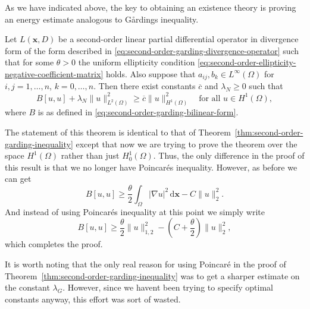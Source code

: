 As we have indicated above, the key to obtaining an existence theory is proving an energy estimate analogous to Gårding\textquotesingle s inequality.

\begin{Theorem}
\label{thm:neumann-energy-estimate}
Let $L(\bm{x},D)$ be a second-order linear partial differential operator in divergence form of the form described in \eqref{eq:second-order-garding-divergence-operator} such that for some $\theta>0$ the uniform ellipticity condition \eqref{eq:second-order-ellipticity-negative-coefficient-matrix} holds. Also suppose that $a_{ij},b_k\in L^\infty(\Omega)$ for $i,j=1,\ldots,n$, $k=0,\ldots,n$. Then there exist constants $\overline c$ and $\lambda_N\geq0$ such that
\begin{equation}\label{eq:neumann-energy-coercivity-inequality}
B[u,u]+\lambda_N\|u\|_{L^2(\Omega)}^2\geq\overline c\|u\|_{H^1(\Omega)}^2\quad\text{for all }u\in H^1(\Omega),
\end{equation}
where $B$ is as defined in \eqref{eq:second-order-garding-bilinear-form}.
\end{Theorem}

\begin{Proof}
The statement of this theorem is identical to that of Theorem~\ref{thm:second-order-garding-inequality} except that now we are trying to prove the theorem over the space $H^1(\Omega)$ rather than just $H_0^1(\Omega)$. Thus, the only difference in the proof of this result is that we no longer have Poincaré\textquotesingle s inequality. However, as before we can get
\begin{equation}\label{eq:neumann-energy-gradient-lower-bound}
B[u,u]\geq\dfrac{\theta}{2}\int_\Omega|\nabla u|^2\,\mathrm{d}\bm{x}-C\|u\|_2^2.
\end{equation}
And instead of using Poincaré\textquotesingle s inequality at this point we simply write
\begin{equation}\label{eq:neumann-energy-full-h1-lower-bound}
B[u,u]\geq\dfrac{\theta}{2}\|u\|_{1,2}^2-\left(C+\dfrac{\theta}{2}\right)\|u\|_2^2,
\end{equation}
which completes the proof.
\end{Proof}

It is worth noting that the only real reason for using Poincaré in the proof of Theorem~\ref{thm:second-order-garding-inequality} was to get a sharper estimate on the constant $\lambda_G$. However, since we haven\textquotesingle t been trying to specify optimal constants anyway, this effort was sort of wasted.

